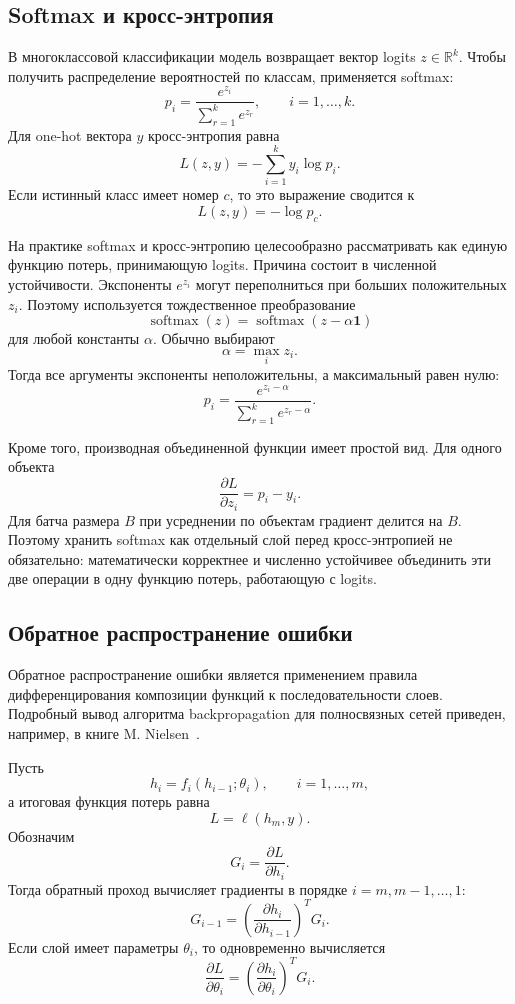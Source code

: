 \documentclass{article}
\begin{document}
\subsection{Softmax и кросс-энтропия}

В многоклассовой классификации модель возвращает вектор logits
$z \in \mathbb{R}^{k}$. Чтобы получить распределение вероятностей по
классам, применяется softmax:
\[
    p_i =
    \frac{e^{z_i}}{\sum_{r=1}^{k} e^{z_r}},
    \qquad i=1,\ldots,k.
\]
Для one-hot вектора $y$ кросс-энтропия равна
\[
    L(z, y)
    =
    -\sum_{i=1}^{k}
    y_i \log p_i.
\]
Если истинный класс имеет номер $c$, то это выражение сводится к
\[
    L(z, y) = -\log p_c.
\]

На практике softmax и кросс-энтропию целесообразно рассматривать как
единую функцию потерь, принимающую logits. Причина состоит в численной
устойчивости. Экспоненты $e^{z_i}$ могут переполниться при больших
положительных $z_i$. Поэтому используется тождественное преобразование
\[
    \operatorname{softmax}(z)
    =
    \operatorname{softmax}(z - \alpha\mathbf{1})
\]
для любой константы $\alpha$. Обычно выбирают
\[
    \alpha = \max_i z_i.
\]
Тогда все аргументы экспоненты неположительны, а максимальный равен
нулю:
\[
    p_i =
    \frac{e^{z_i-\alpha}}
         {\sum_{r=1}^{k} e^{z_r-\alpha}}.
\]

Кроме того, производная объединенной функции имеет простой вид. Для
одного объекта
\[
    \frac{\partial L}{\partial z_i}
    =
    p_i - y_i.
\]
Для батча размера $B$ при усреднении по объектам градиент делится на
$B$. Поэтому хранить softmax как отдельный слой перед
кросс-энтропией не обязательно: математически корректнее и численно
устойчивее объединить эти две операции в одну функцию потерь,
работающую с logits.

\subsection{Обратное распространение ошибки}

Обратное распространение ошибки является применением правила
дифференцирования композиции функций к последовательности слоев.
Подробный вывод алгоритма backpropagation для полносвязных сетей
приведен, например, в книге M.
Nielsen~\cite{nielsen2015neural}.

Пусть
\[
    h_i = f_i(h_{i-1}; \theta_i),
    \qquad i=1,\ldots,m,
\]
а итоговая функция потерь равна
\[
    L = \ell(h_m, y).
\]
Обозначим
\[
    G_i =
    \frac{\partial L}{\partial h_i}.
\]
Тогда обратный проход вычисляет градиенты в порядке
$i=m,m-1,\ldots,1$:
\[
    G_{i-1}
    =
    \left(
        \frac{\partial h_i}{\partial h_{i-1}}
    \right)^T
    G_i.
\]
Если слой имеет параметры $\theta_i$, то одновременно вычисляется
\[
    \frac{\partial L}{\partial \theta_i}
    =
    \left(
        \frac{\partial h_i}{\partial \theta_i}
    \right)^T
    G_i.
\]
\end{document}
